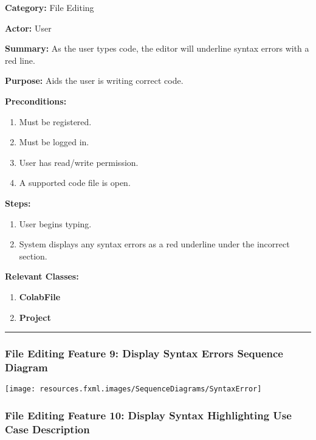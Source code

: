 \documentclass[twoside,letterpaper]{article}
\begin{document}
	\noindent\textbf{Category:} File Editing \newline
	
	\noindent\textbf{Actor:} User \newline
	
	\noindent\textbf{Summary:} As the user types code, the editor will underline syntax errors with a red line. \newline
	
	\noindent\textbf{Purpose:} Aids the user is writing correct code. \newline
	
	\noindent\textbf{Preconditions:}
	\begin{enumerate}
		\item Must be registered.
		\item Must be logged in.
		\item User has read/write permission.
		\item A supported code file is open.
	\end{enumerate}
	\noindent\textbf{Steps:}
	\begin{enumerate}
		\item User begins typing.
		\item System displays any syntax errors as a red underline under the incorrect section.
	\end{enumerate}
	\noindent\textbf{Relevant Classes:}
	\begin{enumerate}
	    \item \textbf {ColabFile}
	    \item \textbf {Project}
	\end{enumerate}    
\vspace{8pt}
\hrule
\newpage

\subsubsection[File Editing Feature 9: Display Syntax Errors Sequence Diagram]{\rmfamily\bfseries\color{black}
	File Editing Feature 9: Display Syntax Errors Sequence Diagram}
\hypertarget{RefHeading22059017292}{}

\bigskip

\texttt{[image: resources.fxml.images/SequenceDiagrams/SyntaxError]}

\newpage

\subsubsection[File Editing Feature 10: Display Syntax Highlighting]{\rmfamily\bfseries\color{black}
	File Editing Feature 10: Display Syntax Highlighting Use Case Description}
\hypertarget{RefHeading22059017292}{}
\end{document}
